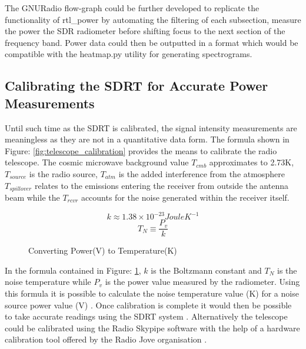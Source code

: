 The GNURadio flow-graph could be further developed to replicate the functionality of rtl\_power by automating the filtering of each subsection, measure the power the \gls{SDR} radiometer before shifting focus to the next section of the frequency band. Power data could then be outputted in a format which would be compatible with the heatmap.py utility for generating spectrograms.

\subsection*{Calibrating the SDRT for Accurate Power Measurements}

Until such time as the SDRT is calibrated, the signal intensity measurements are meaningless as they are not in a quantitative data form. The formula shown in Figure: \ref{fig:telescope_calibration} provides the means to calibrate the radio telescope. The cosmic microwave background value $T_{cmb}$  approximates to 2.73K, $T_{source}$ is the radio source, $T_{atm}$ is the added interference from the atmosphere $T_{spillover}$ relates to the emissions entering the receiver from outside the antenna beam while the $T_{rcvr}$ accounts for the noise generated within the receiver itself.

%
\begin{figure}[here]
	\centering
	\begin{equation}
	k \approx 1.38 \times 10^{-23} Joule K^{-1}
	\end{equation}
	\begin{equation}
	T_N \equiv \frac{P_v}{k}
	\end{equation}
	\caption{Converting Power(V) to Temperature(K)}
	\label{fig:power_to_kelvin_formula}
\end{figure}
%

In the formula contained in Figure: \ref{fig:power_to_kelvin_formula}, $k$ is the Boltzmann constant and $T_N$ is the noise temperature while $P_v$ is the power value measured by the radiometer. Using this formula it is possible to calculate the noise temperature value (K) for a noise source power value (V) \citep{nrao-10}. Once calibration is complete it would then be possible to take accurate readings using the SDRT system \citep{nrao-10}. Alternatively the telescope could be calibrated using the Radio Skypipe software with the help of a hardware calibration tool offered by the Radio Jove organisation \citep{rsp-15} \citep{nasa10}.

